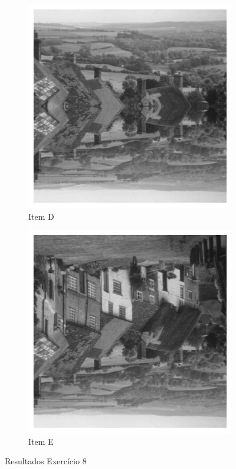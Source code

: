 \documentclass[12pt,a4paper]{report}
\begin{document}
\begin{figure}[H]
  \begin{subfigure}{0.3\textwidth}
    \includegraphics[width=\linewidth]{imagens/ex8-d.png}
    \caption{Item D}
  \end{subfigure}
  \begin{subfigure}{0.3\textwidth}
    \includegraphics[width=\linewidth]{imagens/ex8-e.png}
    \caption{Item E}
  \end{subfigure}

  \caption{Resultados Exercício 8}
\end{figure}
\end{document}
